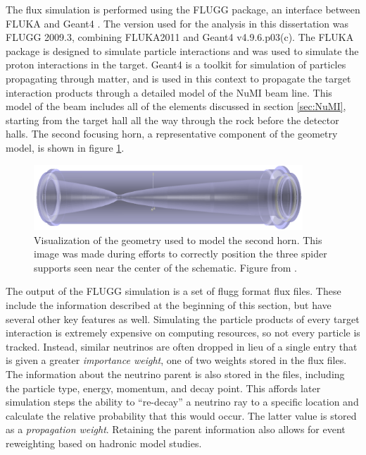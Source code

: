The flux simulation is performed using the FLUGG package, an interface between FLUKA \cite{ref:Fluka1, ref:Fluka2} and Geant4 \cite{ref:Geant41, ref:Geant42}. The version used for the analysis in this dissertation was FLUGG 2009.3, combining FLUKA2011 and Geant4 v4.9.6.p03(c). The FLUKA package is designed to simulate particle interactions and was used to simulate the proton interactions in the target. Geant4 is a toolkit for simulation of particles propagating through matter, and is used in this context to propagate the target interaction products through a detailed model of the NuMI beam line. This model of the beam includes all of the elements discussed in section \ref{sec:NuMI}, starting from the target hall all the way through the rock before the detector halls. The second focusing horn, a representative component of the geometry model, is shown in figure \ref{fig:GeomHorn}.
\begin{figure}[htb]
  \centering
  \includegraphics[width=0.9\textwidth]{figures/Horn2.png}
  \caption[Model of the Second Focusing Horn]{Visualization of the geometry used to model the second horn. This image was made during efforts to correctly position the three spider supports seen near the center of the schematic. Figure from \cite{ref:GeomNuMI}.}
  \label{fig:GeomHorn}
\end{figure}

The output of the FLUGG simulation is a set of flugg format flux files. These include the information described at the beginning of this section, but have several other key features as well. Simulating the particle products of every target interaction is extremely expensive on computing resources, so not every particle is tracked. Instead, similar neutrinos are often dropped in lieu of a single entry that is given a greater {\em importance weight}, one of two weights stored in the flux files. The information about the neutrino parent is also stored in the files, including the particle type, energy, momentum, and decay point. This affords later simulation steps the ability to ``re-decay'' a neutrino ray to a specific location and calculate the relative probability that this would occur. The latter value is stored as a {\em propagation weight}. Retaining the parent information also allows for event reweighting based on hadronic model studies.

